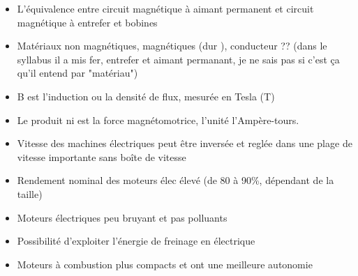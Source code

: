 \begin{questions}
\begin{solution}
\end{solution}

\begin{solution}
\begin{itemize}
\item L'équivalence entre circuit magnétique à aimant permanent et circuit magnétique à entrefer et bobines 
\item Matériaux non magnétiques, magnétiques (dur ), conducteur  ?? (dans le syllabus il a mis fer, entrefer et aimant permanant, je ne sais pas si c'est ça qu'il entend par "matériau")
\item B est l'induction ou la densité de flux, mesurée en Tesla (T)
\item Le produit ni est la force magnétomotrice, l'unité l'Ampère-tours.
\end{itemize}
\end{solution}
\begin{solution}
\begin{itemize}
\item Vitesse des machines électriques peut être inversée et reglée dans une plage de vitesse importante sans boîte de vitesse
\item Rendement nominal des moteurs élec élevé (de 80 à 90\%, dépendant de la taille)
\item Moteurs électriques peu bruyant et pas polluants
\item Possibilité d'exploiter l'énergie de freinage en électrique
\item Moteurs à combustion plus compacts et ont une meilleure autonomie
\end{itemize}
\end{solution}
\end{questions}
